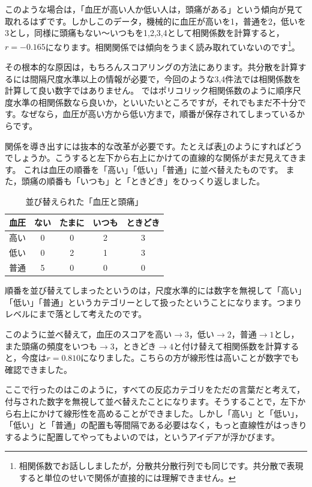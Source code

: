 \documentclass{ltjsbook}
\begin{document}
このような場合は，「血圧が高い人か低い人は，頭痛がある」という傾向が見て取れるはずです。しかしこのデータ，機械的に血圧が高いを1，普通を2，低いを3とし，同様に頭痛もない〜いつもを1,2,3,4として相関係数を計算すると，$r=-0.165$になります。相関関係では傾向をうまく読み取れていないのです\footnote{相関係数でお話ししましたが，分散共分散行列でも同じです。共分散で表現すると単位のせいで関係が直接的には理解できません。}。

その根本的な原因は，もちろんスコアリングの方法にあります。共分散を計算するには間隔尺度水準以上の情報が必要で，今回のような3,4件法では相関係数を計算して良い数字ではありません。
ではポリコリック相関係数のように順序尺度水準の相関係数なら良いか，といいたいところですが，それでもまだ不十分です。なぜなら，血圧が高い方から低い方まで，順番が保存されてしまっているからです。

関係を導き出すには抜本的な改革が必要です。たとえば表\ref{tbl:14_02}のようにすればどうでしょうか。こうすると左下から右上にかけての直線的な関係がまだ見えてきます。
これは血圧の順番を「高い」「低い」「普通」に並べ替えたものです。
また，頭痛の順番も「いつも」と「ときどき」をひっくり返しました。
\begin{table}[ht]
	\begin{center}
		\caption{並び替えられた「血圧と頭痛」}
		\begin{tabular}{c|cccc}
			血圧 & ない & たまに & いつも & ときどき \\
			\hline
			高い & 0  & 0   & 2   & 3    \\
			低い & 0  & 2   & 1   & 3    \\
			普通 & 5  & 0   & 0   & 0    \\
		\end{tabular}
		\label{tbl:14_02}
	\end{center}
\end{table}
順番を並び替えてしまったというのは，尺度水準的には数字を無視して「高い」「低い」「普通」というカテゴリーとして扱ったということになります。つまりレベルにまで落として考えたのです。

このように並べ替えて，血圧のスコアを高い$\to3$，低い$\to2$，普通$\to1$とし，また頭痛の頻度をいつも$\to3$，ときどき$\to4$と付け替えて相関係数を計算すると，今度は$r=0.810$になりました。こちらの方が線形性は高いことが数字でも確認できました。

ここで行ったのはこのように，すべての反応カテゴリをただの言葉だと考えて，付与された数字を無視して並べ替えたことになります。そうすることで，左下から右上にかけて線形性を高めることができました。しかし「高い」と「低い」，「低い」と「普通」の配置も等間隔である必要はなく，もっと直線性がはっきりするように配置してやってもよいのでは，というアイデアが浮かびます。
\end{document}
